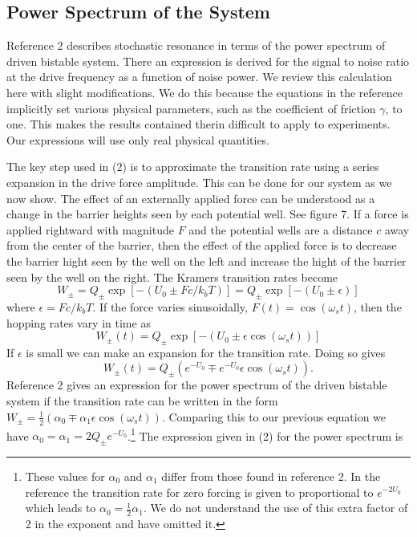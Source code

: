 \documentclass{report}
\begin{document}
\subsection{Power Spectrum of the System}
Reference 2 describes stochastic resonance in terms of the power spectrum of driven bistable system. There an expression is derived for the signal to noise ratio at the drive frequency as a function of noise power. We review this calculation here with slight modifications. We do this because the equations in the reference implicitly set various physical parameters, such as the coefficient of friction $\gamma$, to one. This makes the results contained therin difficult to apply to experiments. Our expressions will use only real physical quantities.

The key step used in (2) is to approximate the transition rate using a series expansion in the drive force amplitude. This can be done for our system as we now show. The effect of an externally applied force can be understood as a change in the barrier heights seen by each potential well. See figure 7. If a force is applied rightward with magnitude $F$ and the potential wells are a distance $c$ away from the center of the barrier, then the effect of the applied force is to decrease the barrier hight seen by the well on the left and increase the hight of the barrier seen by the well on the right. The Kramers transition rates become
\begin{displaymath}
W_{\pm} = Q_{\pm} \exp \left[-(U_0 \pm Fc/k_bT) \right] = Q_{\pm} \exp \left[-(U_0 \pm \epsilon) \right]
\end{displaymath}
where $\epsilon=Fc/k_bT$. If the force varies sinusoidally, $F(t)=\cos(\omega_s t)$, then the hopping rates vary in time as
\begin{displaymath} W_{\pm}(t) = Q_{\pm} \exp \left[-(U_0 \pm \epsilon \cos (\omega_s t)) \right]
\end{displaymath}
If $\epsilon$ is small we can make an expansion for the transition rate. Doing so gives
\begin{displaymath}
W_{\pm}(t) = Q_{\pm} (e^{-U_0} \mp e^{-U_0} \epsilon \cos (\omega_s t)).
\end{displaymath} 
Reference 2 gives an expression for the power spectrum of the driven bistable system if the transition rate can be written in the form $W_{\pm} = \frac{1}{2}(\alpha_0 \mp \alpha_1 \epsilon \cos(\omega_s t))$. Comparing this to our previous equation we have $\alpha_0 = \alpha_1 = 2Q_{\pm}e^{-U_0}$.\footnote{These values for $\alpha_0$ and $\alpha_1$ differ from those found in reference 2. In the reference the transition rate for zero forcing is given to proportional to $e^{-2U_0}$ which leads to $\alpha_0=\frac{1}{2}\alpha_1$. We do not understand the use of this extra factor of 2 in the exponent and have omitted it.} The expression given in (2) for the power spectrum is
\end{document}
